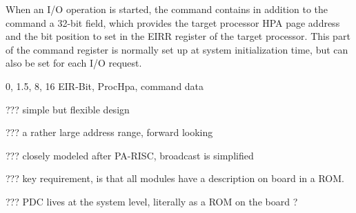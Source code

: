 When an I/O operation is started, the command contains in addition to the command a 32-bit field, which provides the target processor HPA page address and the bit position to set in the EIRR register of the target processor. This part of the command register is normally set up at system initialization time, but can also be set for each I/O request. 

\begin{center}
\drawInstrFormatSixtyFour
        {0, 1.5, 8, 16}
        {EIR-Bit, ProcHpa, command data}
\end{center}



??? simple but flexible design

??? a rather large address range, forward looking 

??? closely modeled after PA-RISC, broadcast is simplified

??? key requirement, is that all modules have a description on board in a ROM.

??? PDC lives at the system level, literally as a ROM on the board ?








